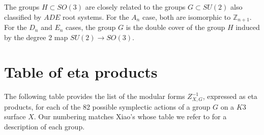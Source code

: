 \documentclass{article}
\theoremstyle{definition}
\newcommand{\ZZ} {{\mathbb Z}}		%
\begin{document}
The groups $H\subset SO(3)$ are closely related to the groups
$G\subset SU(2)$ also classified by $ADE$ root systems. For the
$A_{n}$ case, both are isomorphic to $\ZZ_{n+1}$. For the $D_{n}$ and
$E_{n}$ cases, the group $G$ is the double cover of the group $H$
induced by the degree 2 map $SU(2)\to SO(3)$. 






\clearpage

\section{Table of eta products}\label{app:tableeta}
\renewcommand{\arraystretch}{1.5}



The following table provides the list of the modular forms
$Z_{X,G}^{-1}$, expressed as eta products, for each of the 82 possible
symplectic actions of a group $G$ on a $K3$ surface $X$. Our numbering
matches Xiao's \cite{xiao1996galois} whose table we refer to for a
description of each group.
\end{document}
